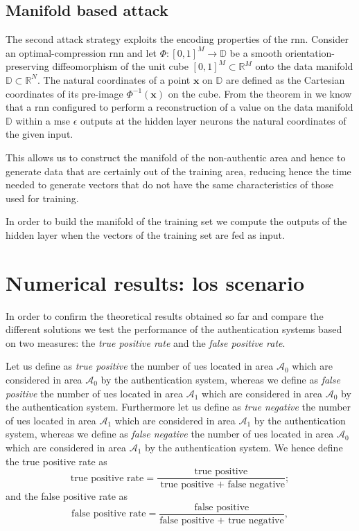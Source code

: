 \documentclass[draftcls,onecolumn,12pt]{IEEEtran}
\begin{document}
\subsection{Manifold based attack}
The second attack strategy exploits the encoding properties of the \ac{rnn}. Consider an optimal-compression \ac{rnn} \cite{hecht-95} and let $\Phi:[0,1]^M \to \mathbb{D}$ be a smooth orientation-preserving diffeomorphism of the unit cube $[0,1]^M \subset \mathbb{R}^M$ onto the data manifold $\mathbb{D} \subset \mathbb{R}^N$. The natural coordinates of a point $\bm{x}$ on $\mathbb{D}$ are defined as the Cartesian coordinates of its pre-image $\Phi^{-1}(\bm{x})$ on the cube. From the theorem in \cite{hecht-95} we know that a \ac{rnn} configured to perform a reconstruction of a value on the data manifold $\mathbb{D}$ within a \ac{mse} $\epsilon$ outputs at the hidden layer neurons the natural coordinates of the given input.

This allows us to construct the manifold of the non-authentic area and hence to generate data that are certainly out of the training area, reducing hence the time needed to generate vectors that do not have the same characteristics of those used for training.

In order to build the manifold of the training set we compute the outputs of the hidden layer when the vectors of the training set are fed as input. 

\section{Numerical results: los scenario}\label{sec:res_los}
In order to confirm the theoretical results obtained so far and compare the different solutions we test the performance of the authentication systems based on two measures: the \textit{true positive rate} and the \textit{false positive rate}. 

Let us define as \textit{true positive} the number of \acp{ue} located in area $\mathcal{A}_0$ which are considered in area $\mathcal{A}_0$ by the authentication system, whereas we define as \textit{false positive} the number of \acp{ue} located in area $\mathcal{A}_1$ which are considered in area $\mathcal{A}_0$ by the authentication system. Furthermore let us define as \textit{true negative} the number of \acp{ue} located in area $\mathcal{A}_1$ which are considered in area $\mathcal{A}_1$ by the authentication system, whereas we define as \textit{false negative} the number of \acp{ue} located in area $\mathcal{A}_0$ which are considered in area $\mathcal{A}_1$ by the authentication system.
We hence define the true positive rate as
\begin{equation}
    \text{true positive rate} = \frac{\text{true positive}}{\text{ true positive + false negative}};
\end{equation}
and the false positive rate as
\begin{equation}
    \text{false positive rate} = \frac{\text{false positive}}{\text{false positive + true negative}},
\end{equation}
\end{document}
